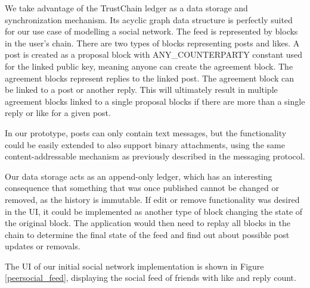 We take advantage of the TrustChain ledger as a data storage and synchronization mechanism. Its acyclic graph data structure is perfectly suited for our use case of modelling a social network. The feed is represented by blocks in the user's chain. There are two types of blocks representing posts and likes. A post is created as a proposal block with ANY\_COUNTERPARTY constant used for the linked public key, meaning anyone can create the agreement block. The agreement blocks represent replies to the linked post. The agreement block can be linked to a post or another reply. This will ultimately result in multiple agreement blocks linked to a single proposal blocks if there are more than a single reply or like for a given post.

In our prototype, posts can only contain text messages, but the functionality could be easily extended to also support binary attachments, using the same content-addressable mechanism as previously described in the messaging protocol.

Our data storage acts as an append-only ledger, which has an interesting consequence that something that was once published cannot be changed or removed, as the history is immutable. If edit or remove functionality was desired in the UI, it could be implemented as another type of block changing the state of the original block. The application would then need to replay all blocks in the chain to determine the final state of the feed and find out about possible post updates or removals.

The UI of our initial social network implementation is shown in Figure \ref{peersocial_feed}, displaying the social feed of friends with like and reply count.

